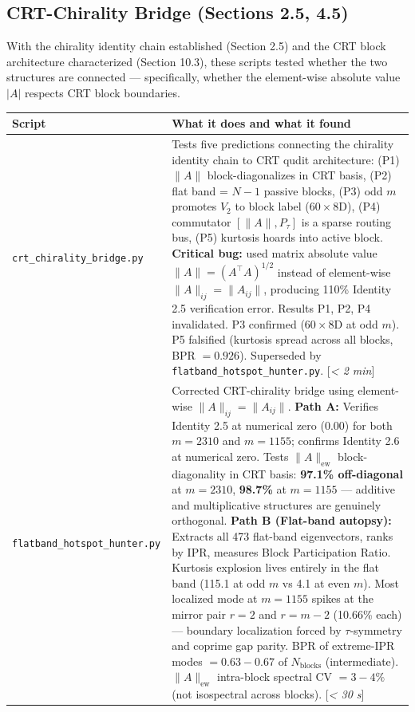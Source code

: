 \documentclass[11pt,letterpaper]{article}
\theoremstyle{definition}
\theoremstyle{remark}
\begin{document}
\subsection{CRT-Chirality Bridge (Sections 2.5, 4.5)}\label{crt-chirality-bridge-sections-2.5-4.5}

With the chirality identity chain established (Section 2.5) and the CRT block architecture characterized (Section 10.3), these scripts tested whether the two structures are connected --- specifically, whether the element-wise absolute value $|A|$ respects CRT block boundaries.

\begin{longtable}[]{@{}
  >{\raggedright\arraybackslash}p{}
  >{\raggedright\arraybackslash}p{}@{}}
\toprule
Script & What it does and what it found \\
\midrule
\endfirsthead
\endhead
\texttt{crt\_chirality\_bridge.py} & Tests five predictions connecting the chirality identity chain to CRT qudit architecture: (P1) $\|A\|$ block-diagonalizes in CRT basis, (P2) flat band = $N{-}1$ passive blocks, (P3) odd $m$ promotes $V_2$ to block label ($60 \times 8$D), (P4) commutator $[\|A\|, P_\tau]$ is a sparse routing bus, (P5) kurtosis hoards into active block. \textbf{Critical bug:} used matrix absolute value $\|A\| = (A^\top A)^{1/2}$ instead of element-wise $\|A\|_{ij} = \|A_{ij}\|$, producing 110\% Identity 2.5 verification error. Results P1, P2, P4 invalidated. P3 confirmed ($60 \times 8$D at odd $m$). P5 falsified (kurtosis spread across all blocks, BPR $= 0.926$). Superseded by \texttt{flatband\_hotspot\_hunter.py}. [\textit{\textless{} 2 min}] \\
\texttt{flatband\_hotspot\_hunter.py} & Corrected CRT-chirality bridge using element-wise $\|A\|_{ij} = \|A_{ij}\|$. \textbf{Path A:} Verifies Identity 2.5 at numerical zero ($0.00$) for both $m = 2310$ and $m = 1155$; confirms Identity 2.6 at numerical zero. Tests $\|A\|_{\text{ew}}$ block-diagonality in CRT basis: \textbf{97.1\% off-diagonal} at $m = 2310$, \textbf{98.7\%} at $m = 1155$ --- additive and multiplicative structures are genuinely orthogonal. \textbf{Path B (Flat-band autopsy):} Extracts all 473 flat-band eigenvectors, ranks by IPR, measures Block Participation Ratio. Kurtosis explosion lives entirely in the flat band (115.1 at odd $m$ vs 4.1 at even $m$). Most localized mode at $m = 1155$ spikes at the mirror pair $r = 2$ and $r = m{-}2$ (10.66\% each) --- boundary localization forced by $\tau$-symmetry and coprime gap parity. BPR of extreme-IPR modes $= 0.63{-}0.67$ of $N_{\text{blocks}}$ (intermediate). $\|A\|_{\text{ew}}$ intra-block spectral CV $= 3{-}4\%$ (not isospectral across blocks). [\textit{\textless{} 30 s}] \\

\end{longtable}
\end{document}
